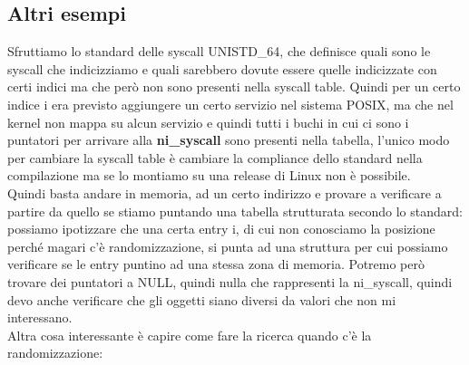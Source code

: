 \documentclass[12pt, oneside]{extbook}
\begin{document}
\subsection{Altri esempi}
Sfruttiamo lo standard delle syscall UNISTD\_64, che definisce quali sono le syscall che indicizziamo e quali sarebbero dovute essere quelle indicizzate con certi indici ma che però non sono presenti nella syscall table. Quindi per un certo indice i era previsto aggiungere un certo servizio nel sistema POSIX, ma che nel kernel non mappa su alcun servizio e quindi tutti i buchi in cui ci sono i puntatori per arrivare alla \textbf{ni\_syscall} sono presenti nella tabella, l'unico modo per cambiare la syscall table è cambiare la compliance dello standard nella compilazione ma se lo montiamo su una release di Linux non è possibile. \\ Quindi basta andare in memoria, ad un certo indirizzo e provare a verificare a partire da quello se stiamo puntando una tabella strutturata secondo lo standard: possiamo ipotizzare che una certa entry i, di cui non conosciamo la posizione perché magari c'è randomizzazione, si punta ad una struttura per cui possiamo verificare se le entry puntino ad una stessa zona di memoria. Potremo però trovare dei puntatori a NULL, quindi nulla che rappresenti la ni\_syscall, quindi devo anche verificare che gli oggetti siano diversi da valori che non mi interessano.\\ Altra cosa interessante è capire come fare la ricerca quando c'è la randomizzazione:
\end{document}
